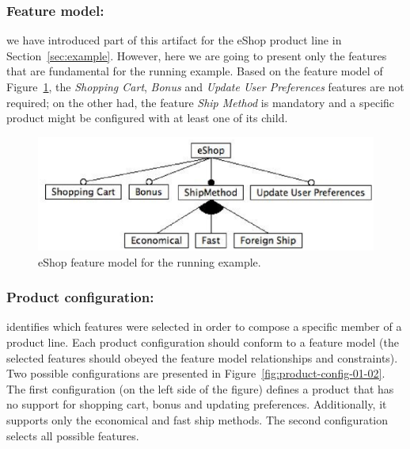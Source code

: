 \subsubsection{Feature model:}

we have introduced part of this artifact for the eShop product line in Section~\ref{sec:example}. However, here we are going to 
present only the features that are fundamental for the running example. Based on the feature model of Figure~\ref{fig:eshop-fm-re}, the \emph{Shopping 
Cart}, \emph{Bonus} and \emph{Update User Preferences} features are not required; on the other had, the feature \emph{Ship Method} is mandatory and 
a specific product might be configured with at least one of its child.  

 \begin{figure}[h]
 \begin{center}
  \includegraphics[scale=0.40]{img/eShop-fm-re.eps}
   \caption{eShop feature model for the running example.}
  \label{fig:eshop-fm-re}
  \end{center}
\end{figure}


\subsubsection{Product configuration:}

identifies which features were selected in order to compose a specific member of a product line. Each product configuration should 
conform to a feature model (the selected features should obeyed the feature model relationships and constraints). Two possible 
configurations are presented in Figure~\ref{fig:product-config-01-02}. The first configuration (on the left side of the figure) defines a
product that has no support for shopping cart, bonus and updating preferences. Additionally, it supports only the economical and fast 
ship methods. The second configuration selects all possible features.  

